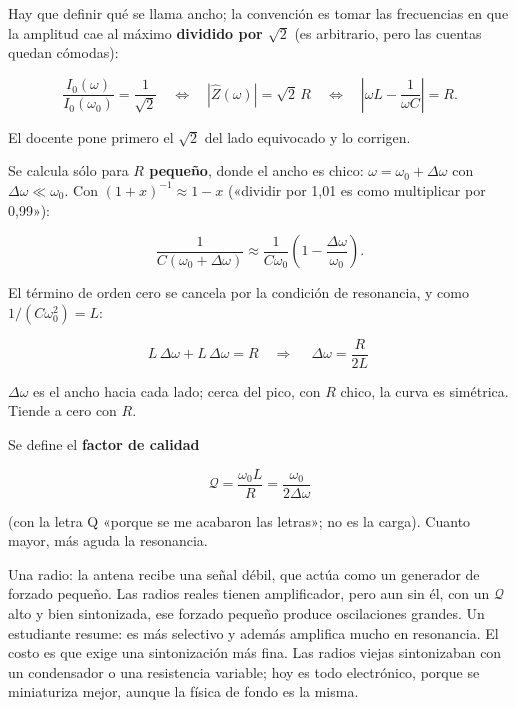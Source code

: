 \documentclass[12pt,a4paper]{article}
\begin{document}
Hay que definir qué se llama ancho; la convención es tomar las frecuencias en
que la amplitud cae al máximo \textbf{dividido por $\sqrt2$} (es arbitrario, pero las
cuentas quedan cómodas):

\[
\frac{I_0(\omega)}{I_0(\omega_0)} = \frac{1}{\sqrt2}
\quad\Longleftrightarrow\quad
|\hat Z(\omega)| = \sqrt2\,R
\quad\Longleftrightarrow\quad
\left|\omega L - \frac{1}{\omega C}\right| = R .
\]

\begin{notebox}
El docente pone primero el $\sqrt2$ del lado equivocado y lo corrigen.
\end{notebox}

Se calcula sólo para \textbf{$R$ pequeño}, donde el ancho es chico:
$\omega = \omega_0 + \Delta\omega$ con $\Delta\omega\ll\omega_0$. Con
$(1+x)^{-1}\approx 1-x$ («dividir por 1,01 es como multiplicar por 0,99»):

\[
\frac{1}{C(\omega_0+\Delta\omega)} \approx \frac{1}{C\omega_0}\left(1-\frac{\Delta\omega}{\omega_0}\right).
\]

El término de orden cero se cancela por la condición de resonancia, y como
$1/(C\omega_0^2) = L$:

\[
L\,\Delta\omega + L\,\Delta\omega = R
\quad\Longrightarrow\quad
\boxed{\ \Delta\omega = \frac{R}{2L}\ }
\]

$\Delta\omega$ es el ancho hacia cada lado; cerca del pico, con $R$ chico, la
curva es simétrica. Tiende a cero con $R$.

Se define el \textbf{factor de calidad}

\begin{keybox}
\[
\boxed{\ \mathcal{Q} = \frac{\omega_0 L}{R} = \frac{\omega_0}{2\Delta\omega}\ }
\]
\end{keybox}

(con la letra Q «porque se me acabaron las letras»; no es la carga). Cuanto
mayor, más aguda la resonancia.

\begin{notebox}
Una radio: la antena recibe una señal débil, que actúa
como un generador de forzado pequeño. Las radios reales tienen amplificador,
pero aun sin él, con un $\mathcal{Q}$ alto y bien sintonizada, ese forzado
pequeño produce oscilaciones grandes. Un estudiante resume: es más selectivo
y además amplifica mucho en resonancia. El costo es que exige una
sintonización más fina. Las radios viejas sintonizaban con un condensador o
una resistencia variable; hoy es todo electrónico, porque se miniaturiza
mejor, aunque la física de fondo es la misma.
\end{notebox}
\end{document}
